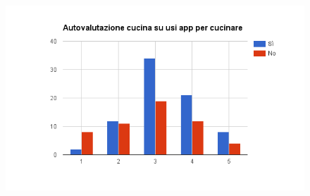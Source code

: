 \begin{figure}[H]
	\includegraphics[width=\textwidth]{img/chart_autovalutazione_e_usi_app}
\end{figure}
